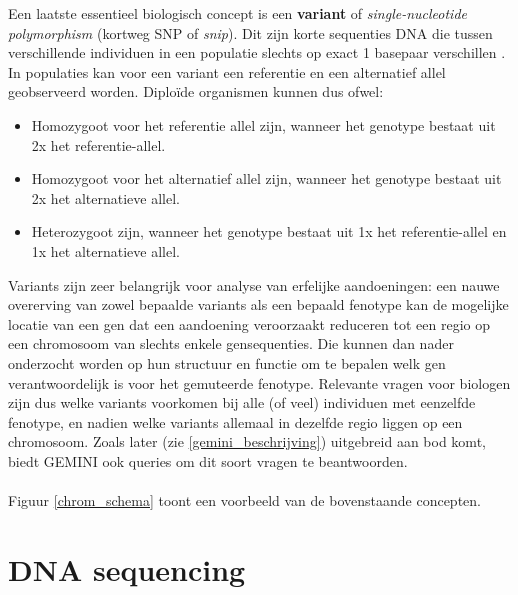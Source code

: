Een laatste essentieel biologisch concept is een \textbf{variant} of \textit{single-nucleotide polymorphism} (kortweg SNP of \textit{snip}). Dit zijn korte sequenties DNA die tussen verschillende individuen in een populatie slechts op exact 1 basepaar verschillen \cite{alberts2007molecular}. In populaties kan voor een variant een referentie en een alternatief allel geobserveerd worden. Diplo\"ide organismen kunnen dus ofwel:
\begin{itemize}
\item Homozygoot voor het referentie allel zijn, wanneer het genotype bestaat uit 2x het referentie-allel.
\item Homozygoot voor het alternatief allel zijn, wanneer het genotype bestaat uit 2x het alternatieve allel.
\item Heterozygoot zijn, wanneer het genotype bestaat uit 1x het referentie-allel en 1x het alternatieve allel.
\end{itemize}

Variants zijn zeer belangrijk voor analyse van erfelijke aandoeningen: een nauwe overerving van zowel bepaalde variants als een bepaald fenotype kan de mogelijke locatie van een gen dat een aandoening veroorzaakt reduceren tot een regio op een chromosoom van slechts enkele gensequenties. Die kunnen dan nader onderzocht worden op hun structuur en functie om te bepalen welk gen verantwoordelijk is voor het gemuteerde fenotype. Relevante vragen voor biologen zijn dus welke variants voorkomen bij alle (of veel) individuen met eenzelfde fenotype, en nadien welke variants allemaal in dezelfde regio liggen op een chromosoom. Zoals later (zie \ref{gemini_beschrijving}) uitgebreid aan bod komt, biedt GEMINI ook queries om dit soort vragen te beantwoorden.\\\\
Figuur \ref{chrom_schema} toont een voorbeeld van de bovenstaande concepten.

\section{DNA sequencing}

